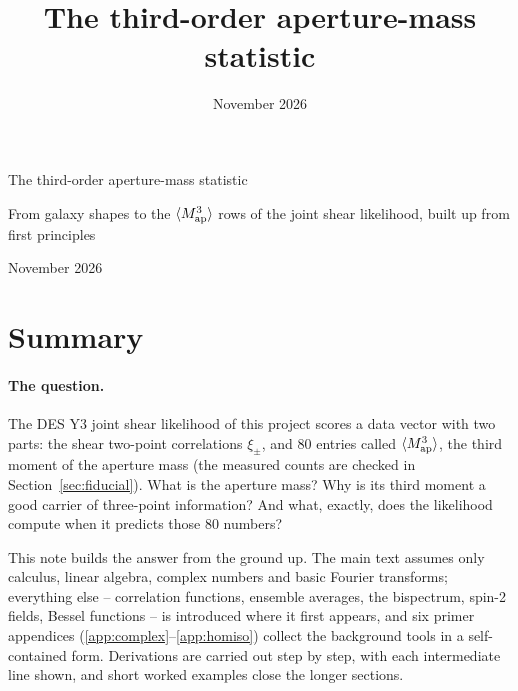\documentclass[11pt]{article}
\title{The third-order aperture-mass statistic}
\date{November 2026}
\author{}
\newcommand{\Map}{M_{\rm ap}}
\numberwithin{equation}{section}
\begin{document}
\begin{center}
  {\LARGE The third-order aperture-mass statistic\par}
  \vspace{0.4em}
  {\large From galaxy shapes to the $\langle\Map^3\rangle$ rows of the
    joint shear likelihood, built up from first principles\par}
  \vspace{0.6em}
  {\large November 2026\par}
\end{center}
\vspace{0.5em}

\tableofcontents
\vspace{1em}

\section{Summary}
\label{sec:summary}

\paragraph{The question.}
The DES Y3 joint shear likelihood of this project scores a data vector
with two parts: the shear two-point correlations $\xi_\pm$, and $80$
entries called $\langle\Map^3\rangle$, the third moment of the
aperture mass (the measured counts are checked in
Section~\ref{sec:fiducial}).  What is the aperture mass?  Why is its
third moment a good carrier of three-point information?  And what,
exactly, does the likelihood compute when it predicts those $80$
numbers?

This note builds the answer from the ground up.  The main text assumes
only calculus, linear algebra, complex numbers and basic Fourier
transforms; everything else -- correlation functions, ensemble
averages, the bispectrum, spin-2 fields, Bessel functions -- is
introduced where it first appears, and six primer appendices
(\ref{app:complex}--\ref{app:homiso}) collect the background tools in
a self-contained form.  Derivations are carried out step by step, with
each intermediate line shown, and short worked examples close the
longer sections.
\end{document}
